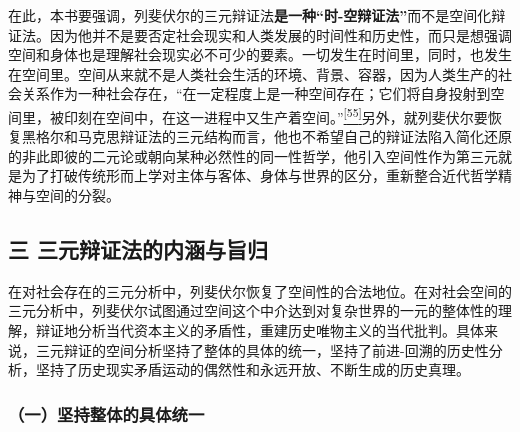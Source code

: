 \documentclass[UTF8, fontset = sourcesans, a4paper, oneside, zihao =
-4, scheme=chinese, no-math, space=true]{ctexbook}
\begin{document}
在此，本书要强调，列斐伏尔的三元辩证法\textbf{是一种``时-空辩证法''}而不是空间化辩证法。因为他并不是要否定社会现实和人类发展的时间性和历史性，而只是想强调空间和身体也是理解社会现实必不可少的要素。一切发生在时间里，同时，也发生在空间里。空间从来就不是人类社会生活的环境、背景、容器，因为人类生产的社会关系作为一种社会存在，``在一定程度上是一种空间存在；它们将自身投射到空间里，被印刻在空间中，在这一进程中又生产着空间。''\protect\hypertarget{part0005_split_003.htmlux5cux23w55}{}{}\protect\hyperlink{part0005_split_003.htmlux5cux23m55}{\textsuperscript{{[}55{]}}}另外，就列斐伏尔要恢复黑格尔和马克思辩证法的三元结构而言，他也不希望自己的辩证法陷入简化还原的非此即彼的二元论或朝向某种必然性的同一性哲学，他引入空间性作为第三元就是为了打破传统形而上学对主体与客体、身体与世界的区分，重新整合近代哲学精神与空间的分裂。

\subsection{三
三元辩证法的内涵与旨归}\label{part0005_split_003.htmlux5cux23c012}

在对社会存在的三元分析中，列斐伏尔恢复了空间性的合法地位。在对社会空间的三元分析中，列斐伏尔试图通过空间这个中介达到对复杂世界的一元的整体性的理解，辩证地分析当代资本主义的矛盾性，重建历史唯物主义的当代批判。具体来说，三元辩证的空间分析坚持了整体的具体的统一，坚持了前进-回溯的历史性分析，坚持了历史现实矛盾运动的偶然性和永远开放、不断生成的历史真理。

\subsubsection{（一）坚持整体的具体统一}\label{part0005_split_003.htmlux5cux23d005}
\end{document}
